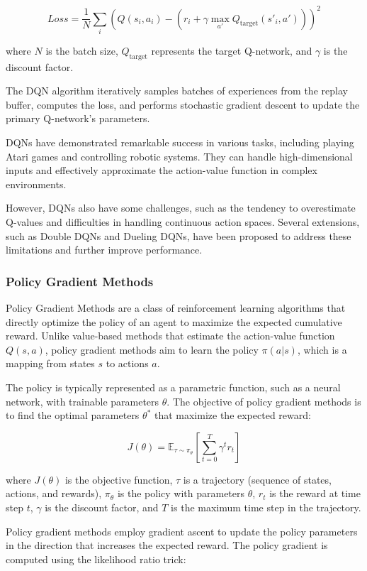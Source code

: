 \[Loss = \frac{1}{N} \sum_{i}(Q(s_i, a_i) - (r_i + \gamma \max_{a'}Q_{\text{target}}(s'_i, a')))^2\]

where \(N\) is the batch size, \(Q_{\text{target}}\) represents the target Q-network, and \(\gamma\) is the discount factor.

The DQN algorithm iteratively samples batches of experiences from the replay buffer, computes the loss, and performs stochastic gradient descent to update the primary Q-network's parameters.

DQNs have demonstrated remarkable success in various tasks, including playing Atari games and controlling robotic systems. They can handle high-dimensional inputs and effectively approximate the action-value function in complex environments.

However, DQNs also have some challenges, such as the tendency to overestimate Q-values and difficulties in handling continuous action spaces. Several extensions, such as Double DQNs and Dueling DQNs, have been proposed to address these limitations and further improve performance.

\subsubsection{Policy Gradient Methods}
Policy Gradient Methods are a class of reinforcement learning algorithms that directly optimize the policy of an agent to maximize the expected cumulative reward. Unlike value-based methods that estimate the action-value function \(Q(s, a)\), policy gradient methods aim to learn the policy \(\pi(a|s)\), which is a mapping from states \(s\) to actions \(a\).

The policy is typically represented as a parametric function, such as a neural network, with trainable parameters \(\theta\). The objective of policy gradient methods is to find the optimal parameters \(\theta^*\) that maximize the expected reward:

\[J(\theta) = \mathbb{E}_{\tau \sim \pi_{\theta}} \left[ \sum_{t=0}^{T} \gamma^t r_t \right]\]

where \(J(\theta)\) is the objective function, \(\tau\) is a trajectory (sequence of states, actions, and rewards), \(\pi_{\theta}\) is the policy with parameters \(\theta\), \(r_t\) is the reward at time step \(t\), \(\gamma\) is the discount factor, and \(T\) is the maximum time step in the trajectory.

Policy gradient methods employ gradient ascent to update the policy parameters in the direction that increases the expected reward. The policy gradient is computed using the likelihood ratio trick:

